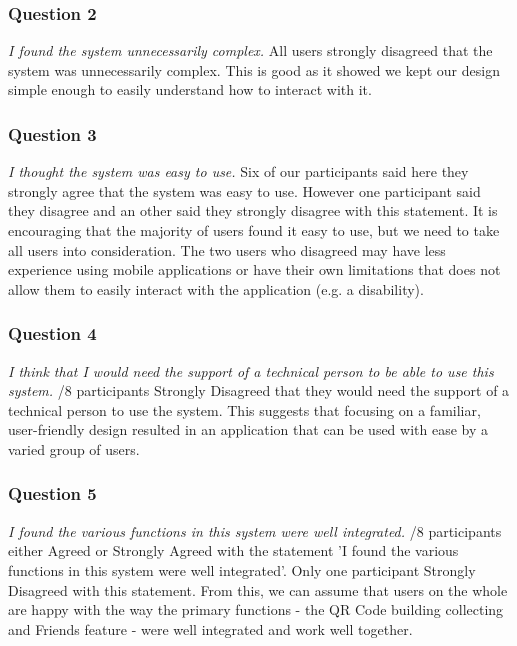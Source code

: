 \documentclass[a4,10pt,twocolumn]{article}
\begin{document}
\subsubsection{Question 2}
\noindent\emph{I found the system unnecessarily complex.}
\newline
\newline
All users strongly disagreed that the system was unnecessarily complex. This is good as it showed we kept our design simple enough to easily understand how to interact with it.

\subsubsection{Question 3}
\noindent\emph{I thought the system was easy to use.}
\newline
\newline
Six of our participants said here they strongly agree that the system was easy to use. However one participant said they disagree and an other said they strongly disagree with this statement. It is encouraging that the majority of users found it easy to use, but we need to take all users into consideration. The two users who disagreed may have less experience using mobile applications or have their own limitations that does not allow them to easily interact with the application (e.g. a disability).

\subsubsection{Question 4}
\noindent\emph{I think that I would need the support of a technical person to be able to use this system.}
\newline
{}/8 participants Strongly Disagreed that they would need the support of a technical person to use the system. This suggests that focusing on a familiar, user-friendly design resulted in an application that can be used with ease by a varied group of users. 

\subsubsection{Question 5}
\noindent\emph{I found the various functions in this system were well integrated.}
\newline
{}/8 participants either Agreed or Strongly Agreed with the statement 'I found the various functions in this system were well integrated'. Only one participant Strongly Disagreed with this statement. From this, we can assume that users on the whole are happy with the way the primary functions - the QR Code building collecting and Friends feature - were well integrated and work well together. 
\end{document}
